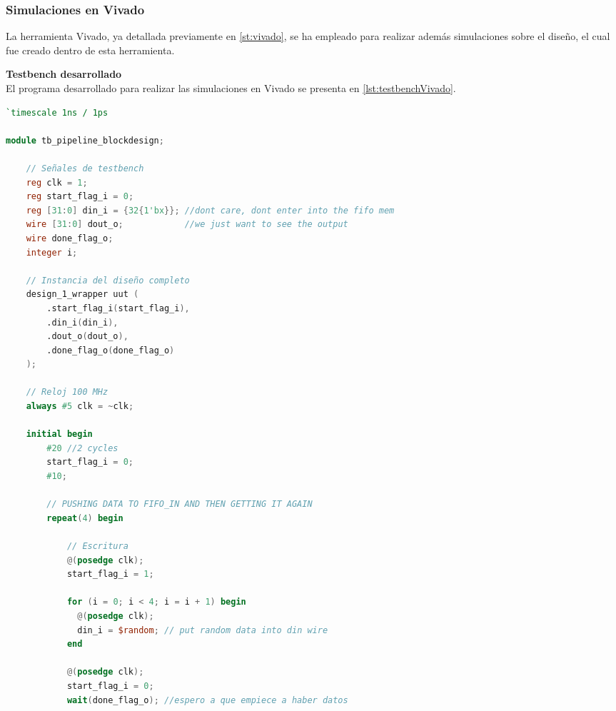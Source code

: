 \subsubsection{Simulaciones en Vivado}
La herramienta Vivado, ya detallada previamente en \ref{st:vivado}, se ha empleado para realizar además simulaciones sobre el diseño, el cual fue creado dentro de esta herramienta.

\vspace{0.4em} %

\begin{adjustwidth}{1.5cm}{}
\textbf{Testbench desarrollado} \vspace{0.25cm} \\
El programa desarrollado para realizar las simulaciones en Vivado se presenta en \ref{lst:testbenchVivado}.

\begin{lstlisting}[language=verilog,frame=single,caption={Código fuente del testtbench para simular en Vivado},showstringspaces=false,label=lst:testbenchVivado]
`timescale 1ns / 1ps

module tb_pipeline_blockdesign;

    // Señales de testbench
    reg clk = 1;
    reg start_flag_i = 0;
    reg [31:0] din_i = {32{1'bx}}; //dont care, dont enter into the fifo mem
    wire [31:0] dout_o;            //we just want to see the output
    wire done_flag_o;
    integer i;

    // Instancia del diseño completo
    design_1_wrapper uut (
        .start_flag_i(start_flag_i),
        .din_i(din_i),
        .dout_o(dout_o),
        .done_flag_o(done_flag_o)
    );

    // Reloj 100 MHz
    always #5 clk = ~clk;

    initial begin
        #20 //2 cycles
        start_flag_i = 0;
        #10;

        // PUSHING DATA TO FIFO_IN AND THEN GETTING IT AGAIN
        repeat(4) begin
            
            // Escritura
            @(posedge clk);
            start_flag_i = 1;
            
            for (i = 0; i < 4; i = i + 1) begin
              @(posedge clk);
              din_i = $random; // put random data into din wire
            end

            @(posedge clk);
            start_flag_i = 0;
            wait(done_flag_o); //espero a que empiece a haber datos


\end{lstlisting}
\end{adjustwidth}
